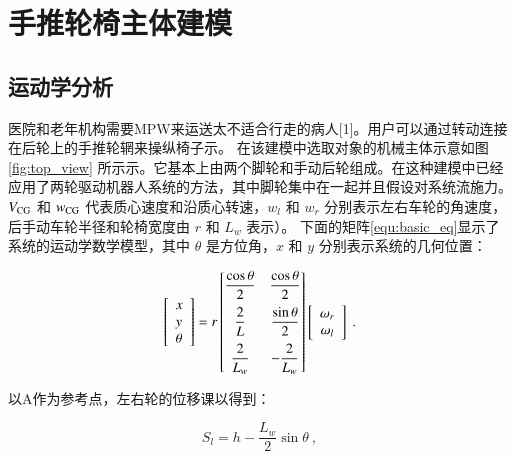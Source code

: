 \section{手推轮椅主体建模}

\subsection{运动学分析}

	医院和老年机构需要MPW来运送太不适合行走的病人[1]。用户可以通过转动连接在后轮上的手推轮辋来操纵椅子示。
	在该建模中选取对象的机械主体示意如图 \ref{fig:top_view} 所示示。它基本上由两个脚轮和手动后轮组成。在这种建模中已经应用了两轮驱动机器人系统的方法，其中脚轮集中在一起并且假设对系统流施力。 
	$ V_{\rm{CG}} $ 和 $ w_{\rm{CG}} $ 代表质心速度和沿质心转速，$ w_l $ 和 $ w_r $ 分别表示左右车轮的角速度，后手动车轮半径和轮椅宽度由 $ r $ 和 $ L_w $ 表示）。
	下面的矩阵\ref{equ:basic_eq}显示了系统的运动学数学模型，其中 $ \theta $ 是方位角，$ x $ 和 $ y $ 分别表示系统的几何位置：
	
	\begin{equation}
	\label{equ:basic_eq}
	\begin{bmatrix} \begin{array}{l}{x} \\ {y} \\ {\theta}\end{array} \end{bmatrix}
	=
	r
	\begin{bmatrix}
		\vspace{0.2cm} {\dfrac{\cos \theta}{2}} & {\dfrac{\cos \theta}{2}} \\
		\vspace{0.2cm} {\dfrac{2}{L}} & {\dfrac{\sin \theta}{2}} \\
		{\dfrac{2}{L_w}} & - {\dfrac{2}{L_w}}
	\end{bmatrix}
	\begin{bmatrix} \begin{array}{c}{\omega_r} \\ {\omega_l}\end{array} \end{bmatrix}
	\ .
	\end{equation}
	
	以A作为参考点，左右轮的位移课以得到： 
	
	\begin{equation}
	\label{equ:left_s}
	S_l = h
	-
	\frac{L_w}{2} \sin \theta
	\ ,
	\end{equation}
	
